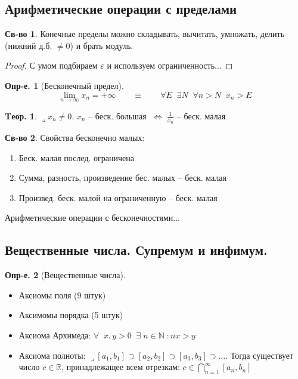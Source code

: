 \documentclass[a4paper,12pt]{article}
\numberwithin{figure}{section}
\theoremstyle{definition}
\newtheorem{definition}{Опр-е.}[section]
\newtheorem*{property}{Св-во}  %
\theoremstyle{definition}
\newtheorem{theorem}{Tеор.}[section]
\def\DS{\displaystyle}
\def\NN{\mathbb{N}}
\def\RR{\mathbb{R}}
\def\.{\;\;}
\def\eps{\varepsilon}
\def\ntoinf{n\to\infty}
\def\lets{{\huge$\lrcorner$}\space}
\def\iff{$\;\Longleftrightarrow\;$}
\begin{document}
\subsection{Арифметические операции с пределами}

\begin{property}
	Конечные пределы можно складывать, вычитать, умножать,
	делить (нижний д.б. $\ne0$) и брать модуль.
\end{property}
\begin{proof} С умом подбираем $\eps$ и используем ограниченность... \end{proof}
\bigskip

\begin{definition}[Бесконечный предел] \[
	\lim_{\ntoinf} x_n = +\infty
	\qquad\equiv\qquad
	\forall E \. \exists N \. \forall n>N \. x_n>E
\]
\end{definition}

\begin{theorem}
	\lets $x_n \neq 0$. $x_n$ -- беск. большая \iff $\DS\frac1{x_n}$ -- беск. малая
\end{theorem}

\begin{property}
	Свойства бесконечно малых:
	\begin{enumerate}
		\item Беск. малая послед. ограничена
		\item Сумма, разность, произведение бес. малых -- беск. малая
		\item Произвед. беск. малой на ограниченную -- беск. малая
	\end{enumerate}
\end{property}
\bigskip

Арифметические операции с бесконечностями...


\subsection{Вещественные числа. Супремум и инфимум.}

\begin{definition}[Вещественные числа] \ \\
	\begin{itemize}
		\item Аксиомы поля (9 штук)
		\item Аксимомы порядка (5 штук)
		\item Аксиома Архимеда:
				$ \forall\. x,y>0 \. \exists \; n \in \NN \;: nx>y $
		\item Аксиома полноты:
			\lets $[a_1,b_1] \supset [a_2,b_2] \supset [a_3,b_3] \supset...$.
			Тогда существует число $c \in \RR$, принадлежащее всем отрезкам:
			$\DS c \in \bigcap_{n=1}^{\infty} [a_n,b_n]$
	\end{itemize}
\end{definition}
\bigskip
\end{document}
